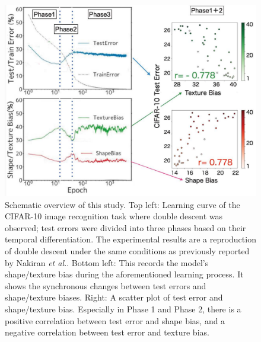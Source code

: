 \begin{figure}[h]
\centering
\includegraphics[width=1.0\columnwidth]{fig/result_overview.pdf}
\caption[Schematic overview of this study.]{
Schematic overview of this study. Top left: Learning curve of the CIFAR-10 image recognition task where double descent was observed; test errors were divided into three phases based on their temporal differentiation. The experimental results are a reproduction of double descent under the same conditions as previously reported by Nakiran \textit{et al.}\cite{nakkiran2021deep}. Bottom left: This records the model's shape/texture bias during the aforementioned learning process. It shows the synchronous changes between test errors and shape/texture biases. Right: A scatter plot of test error and shape/texture bias. Especially in Phase 1 and Phase 2, there is a positive correlation between test error and shape bias, and a negative correlation between test error and texture bias.
}
\end{figure}
